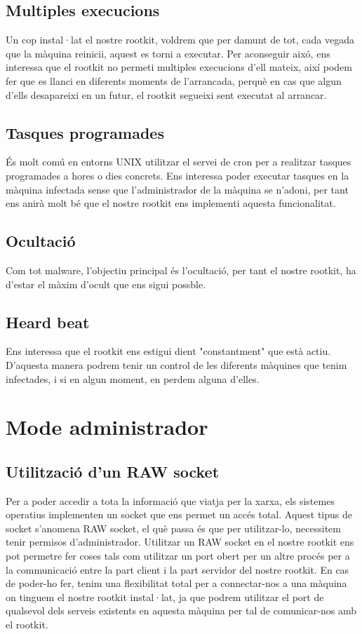 \subsection{Multiples execucions}
Un cop instal·lat el nostre rootkit, voldrem que per damunt de tot, cada vegada que la màquina reinicii, aquest es torni a executar. 
Per aconseguir aixó, ens interessa que el rootkit no permeti multiples execucions d'ell mateix, així podem fer que es llanci en diferents
moments de l'arrancada, perquè en cas que algun d'ells desapareixi en un futur, el rootkit segueixi sent executat al arrancar.

\subsection{Tasques programades}
És molt comú en entorns UNIX utilitzar el servei de cron per a realitzar tasques programades a hores o dies concrets. Ens interessa
poder executar tasques en la màquina infectada sense que l'administrador de la màquina se n'adoni, per tant ens anirà molt bé que 
el nostre rootkit ens implementi aquesta funcionalitat.

\subsection{Ocultació}
Com tot malware, l'objectiu principal és l'ocultació, per tant el nostre rootkit, ha d'estar el màxim d'ocult que ens sigui possble.

\subsection{Heard beat}
Ens interessa que el rootkit ens estigui dient "constantment" que està actiu. D'aquesta manera podrem tenir un control de les diferents
màquines que tenim infectades, i si en algun moment, en perdem alguna d'elles.



\section{Mode administrador}
\subsection{Utilització d'un RAW socket}
Per a poder accedir a tota la informació que viatja per la xarxa, els sistemes operatius implementen un socket que ens permet
un accés total. Aquest tipus de socket s'anomena RAW socket, el què passa és que per utilitzar-lo, necessitem tenir permisos
d'administrador.
Utilitzar un RAW socket en el nostre rootkit ens pot permetre fer coses tals com utilitzar un port obert per un altre procés
per a la communicació entre la part client i la part servidor del nostre rootkit. En cas de poder-ho fer, tenim una flexibilitat
total per a connectar-nos a una màquina on tinguem el nostre rootkit instal·lat, ja que podrem utilitzar el port de qualsevol dels
serveis existents en aquesta màquina per tal de comunicar-nos amb el rootkit.

